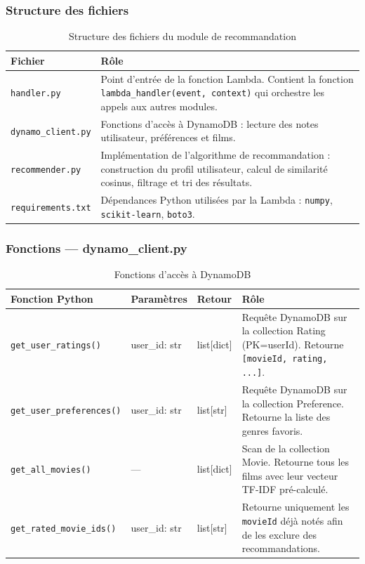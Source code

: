 \documentclass[a4paper,12pt]{report}
\begin{document}
\subsubsection{Structure des fichiers}

\begin{table}[htbp]
\centering
\begin{tabular}{lp{10cm}}
\toprule
\textbf{Fichier} & \textbf{Rôle} \\
\midrule

\texttt{handler.py} & Point d'entrée de la fonction Lambda. Contient la fonction \texttt{lambda\_handler(event, context)} qui orchestre les appels aux autres modules. \\

\texttt{dynamo\_client.py} & Fonctions d'accès à DynamoDB : lecture des notes utilisateur, préférences et films. \\

\texttt{recommender.py} & Implémentation de l'algorithme de recommandation : construction du profil utilisateur, calcul de similarité cosinus, filtrage et tri des résultats. \\

\texttt{requirements.txt} & Dépendances Python utilisées par la Lambda : \texttt{numpy}, \texttt{scikit-learn}, \texttt{boto3}. \\

\bottomrule
\end{tabular}
\caption{Structure des fichiers du module de recommandation}
\end{table}
\newpage
\subsubsection{Fonctions — dynamo\_client.py}
\label{dynamo}
\begin{table}[htbp]
\centering
\begin{tabular}{lp{3cm}p{3cm}p{6cm}}
\toprule
\textbf{Fonction Python} & \textbf{Paramètres} & \textbf{Retour} & \textbf{Rôle} \\
\midrule

\texttt{get\_user\_ratings()} & user\_id: str & list[dict] & Requête DynamoDB sur la collection Rating (PK=userId). Retourne \texttt{[{movieId, rating}, ...]}. \\

\texttt{get\_user\_preferences()} & user\_id: str & list[str] & Requête DynamoDB sur la collection Preference. Retourne la liste des genres favoris. \\

\texttt{get\_all\_movies()} & — & list[dict] & Scan de la collection Movie. Retourne tous les films avec leur vecteur TF-IDF pré-calculé. \\

\texttt{get\_rated\_movie\_ids()} & user\_id: str & list[str] & Retourne uniquement les \texttt{movieId} déjà notés afin de les exclure des recommandations. \\

\bottomrule
\end{tabular}
\caption{Fonctions d'accès à DynamoDB}
\end{table}
\newpage
\end{document}
